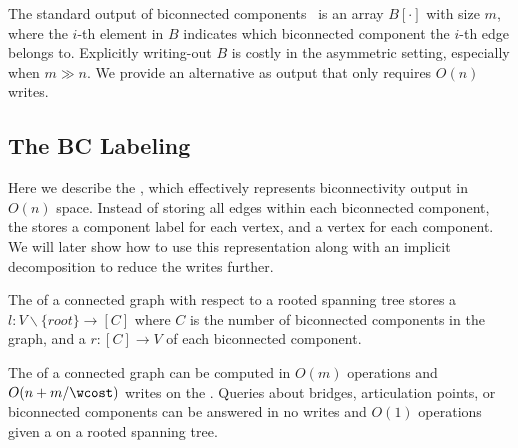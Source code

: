 The standard output of biconnected components~\cite{CLRS,JaJa92}
is an array $B[\cdot]$ with size $m$, where the $i$-th element in $B$
indicates which biconnected component the $i$-th edge belongs to.
Explicitly writing-out $B$ is costly in the asymmetric setting,
especially when $m\gg n$.
We provide an alternative
\imprep{} as output that only requires $O(n)$ writes.

\subsection{The BC Labeling}\label{sec:abstract-imprep}

Here we describe the ,
which effectively represents biconnectivity output in $O(n)$ space.
Instead of storing all edges within each biconnected
component, the \imprep{} stores a component label for each vertex, and a vertex
for each component.  We will later show how to use this representation
along with an implicit decomposition to reduce the writes further.

\begin{definition}[\imprep{}]
  The \imprep{} of a connected graph with respect to a rooted spanning tree
  stores a 
  $l:V\backslash \{\textit{root}\}\to [C]$ where $C$ is the number of
  biconnected components in the graph, and a 
  $r:[C]\to V$ of each biconnected component.
\end{definition}

\begin{lemma}
  The \imprep{} of a connected graph can be computed in $O(m)$ operations
  and $O(n + m/\wcost)$ writes on the \seqmodel. Queries about bridges, articulation
  points, or biconnected components can be answered in no writes and $O(1)$ operations
  given a \imprep{} on a rooted spanning tree.
\end{lemma}



